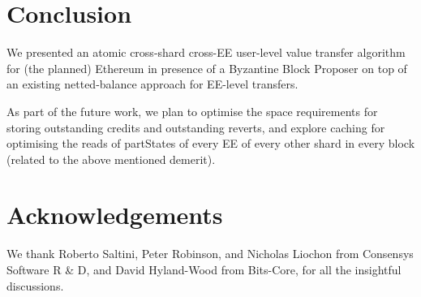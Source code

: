 \documentclass{IEEEtran}
\begin{document}
\section{Conclusion}
We presented an atomic cross-shard cross-EE user-level value transfer algorithm for (the planned) Ethereum in presence of a Byzantine Block Proposer on top of an existing netted-balance approach for EE-level transfers. 

As part of the future work, we plan to optimise the space requirements for storing outstanding credits and outstanding reverts, and explore caching for optimising the reads of partStates of every EE of every other shard in every block (related to the above mentioned demerit).

\section*{Acknowledgements}
We thank Roberto Saltini, Peter Robinson, and Nicholas Liochon from Consensys Software R \& D, and David Hyland-Wood from Bits-Core, for all the insightful discussions.



\end{document}
